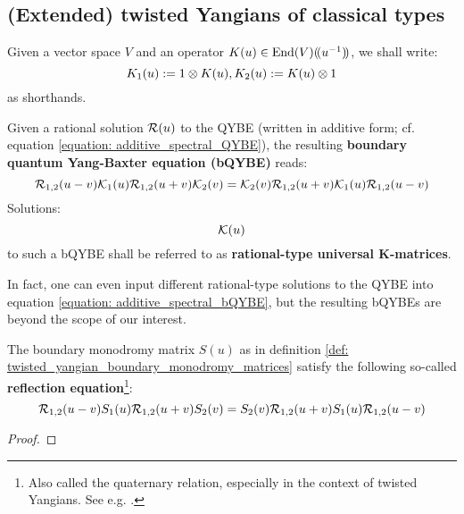     \subsection{(Extended) twisted Yangians of classical types}
        \begin{convention}
            Given a vector space $V$ and an operator $K(u) \in \operatorname{End}(V)(\!(u^{-1})\!)$, we shall write:
                $$K_1(u) := 1 \tensor K(u), K_2(u) := K(u) \tensor 1$$
            as shorthands.
        \end{convention}
        \begin{definition} \label{def: additive_spectral_bQYBE}
            Given a rational solution $\mathcal{R}(u)$ to the QYBE (written in additive form; cf. equation \eqref{equation: additive_spectral_QYBE}), the resulting \textbf{boundary quantum Yang-Baxter equation (bQYBE)} reads:
                \begin{equation} \label{equation: additive_spectral_bQYBE}
                    \mathcal{R}_{1, 2}(u - v) \mathcal{K}_1(u) \mathcal{R}_{1, 2}(u + v) \mathcal{K}_2(v) = \mathcal{K}_2(v) \mathcal{R}_{1, 2}(u + v) \mathcal{K}_1(u) \mathcal{R}_{1, 2}(u - v) 
                \end{equation}
            Solutions:
                $$\mathcal{K}(u)$$
            to such a bQYBE shall be referred to as \textbf{rational-type universal K-matrices}.
        \end{definition}
        \begin{remark}
            In fact, one can even input different rational-type solutions to the QYBE into equation \eqref{equation: additive_spectral_bQYBE}, but the resulting bQYBEs are beyond the scope of our interest.
        \end{remark}
    
        \begin{definition} \label{def: twisted_yangian_boundary_monodromy_matrices}
            
        \end{definition}
        \begin{lemma} \label{lemma: twisted_yangian_boundary_monodromy_matrices_satisfy_reflection_equations}
            The boundary monodromy matrix $S(u)$ as in definition \ref{def: twisted_yangian_boundary_monodromy_matrices} satisfy the following so-called \textbf{reflection equation}\footnote{Also called the quaternary relation, especially in the context of twisted Yangians. See e.g. \cite[Proposition 2.2.1]{molev_yangians_and_classical_lie_algebras}.}:
                \begin{equation} \label{equation: reflection_equations}
                    \mathcal{R}_{1, 2}(u - v) S_1(u) \mathcal{R}_{1, 2}(u + v) S_2(v) = S_2(v) \mathcal{R}_{1, 2}(u + v) S_1(u) \mathcal{R}_{1, 2}(u - v) 
                \end{equation}
        \end{lemma}
            \begin{proof}
                
            \end{proof}
    

